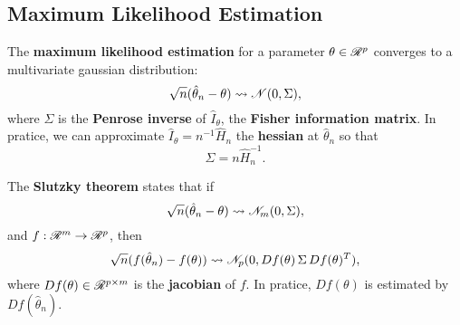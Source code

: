\subsection{Maximum Likelihood Estimation}
\begin{outline}
  \1 The \textbf{maximum likelihood estimation} for a parameter $\theta \in \mathscr{R}^p$
  converges to a multivariate gaussian distribution:
  \begin{equation*}
    \sqrt{n}(\hat\theta_n - \theta) \leadsto \mathscr{N}(0,\Sigma),
  \end{equation*}
  where $\Sigma$ is the \textbf{Penrose inverse} of $\hat I_\theta$, the \textbf{Fisher
    information matrix}. In pratice, we can approximate $\hat I_\theta = n^{-1}\hat H_n$
  the \textbf{hessian} at $\hat\theta_n$ so that
  \begin{equation*}
    \Sigma = n\hat H_n^{-1}.
  \end{equation*}

  \1 The \textbf{Slutzky theorem} states that if 
  \begin{equation*}
    \sqrt{n}(\hat\theta_n - \theta) \leadsto \mathscr{N}_m(0,\Sigma),
  \end{equation*}
  and $f:\mathscr{R}^m\to\mathscr{R}^p$, then 
  \begin{equation*}
    \sqrt{n}(f(\hat\theta_n) - f(\theta)) \leadsto \mathscr{N}_p(0,Df(\theta)\,\Sigma\,Df(\theta)^T),
  \end{equation*}
  where $Df(\theta)\in\mathscr{R}^{p\times m}$ is the \textbf{jacobian} of $f$. In pratice,
  $Df(\theta)$ is estimated by $Df(\hat\theta_n)$.
\end{outline}


